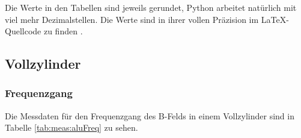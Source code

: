 Die Werte in  den Tabellen sind jeweils gerundet,  Python arbeitet nat\"urlich
mit viel  mehr Dezimalstellen. Die Werte  sind in ihrer vollen  Pr\"azision im
\LaTeX-Quellcode zu finden \cite{ref:aw:github}.


\clearpage
\subsection{Vollzylinder}
\label{sec:ausw:subsec:hohlz}


\subsubsection{Frequenzgang}
\label{sec:ausw:subsec:hohlz:subsubsec:steel}


Die Messdaten f\"ur den Frequenzgang des B-Felds in einem Vollzylinder sind in
Tabelle \ref{tab:meas:aluFreq} zu sehen.

